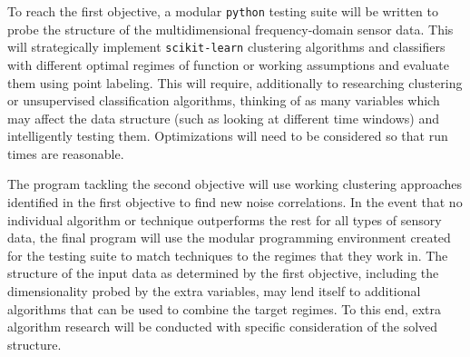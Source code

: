 To reach the first objective, a modular \texttt{python} testing suite will be written to probe the structure of the multidimensional frequency-domain sensor data.
This will strategically implement \texttt{scikit-learn} clustering algorithms and classifiers with different optimal regimes of function or working assumptions and evaluate them using point labeling. 
This will require, additionally to researching clustering or unsupervised classification algorithms, thinking of as many variables which may affect the data structure (such as looking at different time windows) and intelligently testing them. 
Optimizations will need to be considered so that run times are reasonable.

The program tackling the second objective will use working clustering approaches identified in the first objective to find new noise correlations.
In the event that no individual algorithm or technique outperforms the rest for all types of sensory data, the final program will use the modular programming environment created for the testing suite to match techniques to the regimes that they work in.
The structure of the input data as determined by the first objective, including the dimensionality probed by the extra variables, may lend itself to additional algorithms that can be used to combine the target regimes.
To this end, extra algorithm research will be conducted with specific consideration of the solved structure.


